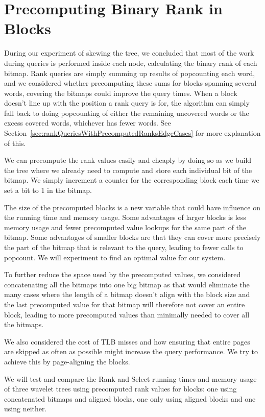 \section{Precomputing Binary Rank in Blocks}
During our experiment of skewing the tree, we concluded that most of the work during queries is performed inside each node, calculating the binary rank of each bitmap.
Rank queries are simply summing up results of popcounting each word, and we considered whether precomputing these sums for blocks spanning several words, covering the bitmaps could improve the query times.
When a block doesn't line up with the position a rank query is for, the algorithm can simply fall back to doing popcounting of either the remaining uncovered words or the excess covered words, whichever has fewer words.
See Section~\ref{sec:rankQueriesWithPrecomputedRanksEdgeCases} for more explanation of this.

We can precompute the rank values easily and cheaply by doing so as we build the tree where we already need to compute and store each individual bit of the bitmap.
We simply increment a counter for the corresponding block each time we set a bit to 1 in the bitmap.

The size of the precomputed blocks is a new variable that could have influence on the running time and memory usage.
Some advantages of larger blocks is less memory usage and fewer precomputed value lookups for the same part of the bitmap.
Some advantages of smaller blocks are that they can cover more precisely the part of the bitmap that is relevant to the query, leading to fewer calls to popcount.
We will experiment to find an optimal value for our system.

To further reduce the space used by the precomputed values, we considered concatenating all the bitmaps into one big bitmap as that would eliminate the many cases where the length of a bitmap doesn't align with the block size and the last precomputed value for that bitmap will therefore not cover an entire block, leading to more precomputed values than minimally needed to cover all the bitmaps.

We also considered the cost of TLB misses and how ensuring that entire pages are skipped as often as possible might increase the query performance. We try to achieve this by page-aligning the blocks.

We will test and compare the Rank and Select running times and memory usage of three wavelet trees using precomputed rank values for blocks: one using concatenated bitmaps and aligned blocks, one only using aligned blocks and one using neither.




